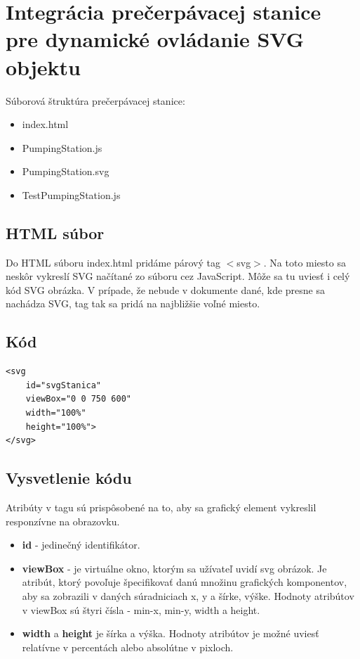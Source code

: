 \section{Integrácia prečerpávacej stanice pre dynamické ovládanie SVG objektu}

Súborová štruktúra prečerpávacej stanice: 
\begin{itemize}
	\item index.html 
	\item PumpingStation.js
	\item PumpingStation.svg
	\item TestPumpingStation.js
\end{itemize}

\subsection{HTML súbor}
Do HTML súboru index.html pridáme párový tag $<$svg$>$.  Na toto miesto sa neskôr vykreslí SVG načítané zo súboru cez JavaScript. Môže sa tu uviesť i celý kód SVG obrázka. V prípade, že nebude v dokumente dané, kde presne sa nachádza SVG, tag tak sa pridá na najbližšie voľné miesto. 
\subsection{Kód}
\begin{lstlisting}
<svg 
	id="svgStanica" 
	viewBox="0 0 750 600" 
	width="100%" 
	height="100%"> 
</svg>
\end{lstlisting}

\subsection{Vysvetlenie kódu}
Atribúty v tagu sú prispôsobené na to, aby sa grafický element vykreslil responzívne na obrazovku.
\begin{itemize}
\item  \textbf{id} - jedinečný identifikátor. 
\item 	\textbf{viewBox} - je virtuálne okno, ktorým sa užívateľ uvidí svg obrázok. Je atribút, ktorý povoľuje špecifikovať danú množinu grafických komponentov, aby sa zobrazili v daných súradniciach x, y a šírke, výške. Hodnoty atribútov v viewBox sú štyri čísla - min-x, min-y, width a height. 
\item 	\textbf{width} a \textbf{height} je šírka a výška. Hodnoty atribútov je možné uviesť relatívne v percentách alebo absolútne v pixloch. 
\end{itemize}


